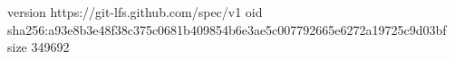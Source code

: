 version https://git-lfs.github.com/spec/v1
oid sha256:a93e8b3e48f38c375c0681b409854b6e3ae5c007792665e6272a19725c9d03bf
size 349692
